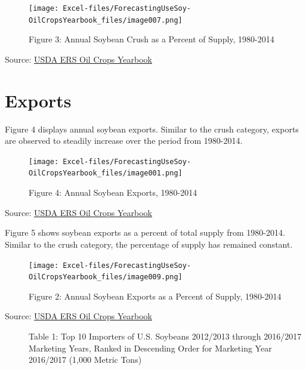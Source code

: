 \documentclass[
]{book}
\begin{document}
\begin{figure}
\centering
\texttt{[image: Excel-files/ForecastingUseSoy-OilCropsYearbook\_files/image007.png]}
\caption{Figure 3: Annual Soybean Crush as a Percent of Supply, 1980-2014}
\end{figure}

Source: \href{http://www.ers.usda.gov/data-products/oil-crops-yearbook.aspx}{USDA ERS Oil Crops Yearbook}

\hypertarget{exports-2}{%
\section{Exports}\label{exports-2}}

Figure 4 displays annual soybean exports. Similar to the crush category, exports are observed to steadily increase over the period from 1980-2014.

\begin{figure}
\centering
\texttt{[image: Excel-files/ForecastingUseSoy-OilCropsYearbook\_files/image001.png]}
\caption{Figure 4: Annual Soybean Exports, 1980-2014}
\end{figure}

Source: \href{http://www.ers.usda.gov/data-products/oil-crops-yearbook.aspx}{USDA ERS Oil Crops Yearbook}

Figure 5 shows soybean exports as a percent of total supply from 1980-2014. Similar to the crush category, the percentage of supply has remained constant.

\begin{figure}
\centering
\texttt{[image: Excel-files/ForecastingUseSoy-OilCropsYearbook\_files/image009.png]}
\caption{Figure 2: Annual Soybean Exports as a Percent of Supply, 1980-2014}
\end{figure}

\begin{description}
\item[Source: \href{http://www.ers.usda.gov/data-products/oil-crops-yearbook.aspx}{USDA ERS Oil Crops Yearbook}]
Table 1: Top 10 Importers of U.S. Soybeans 2012/2013 through 2016/2017 Marketing Years, Ranked in Descending Order for Marketing Year 2016/2017 (1,000 Metric Tons)
\end{description}
\end{document}
